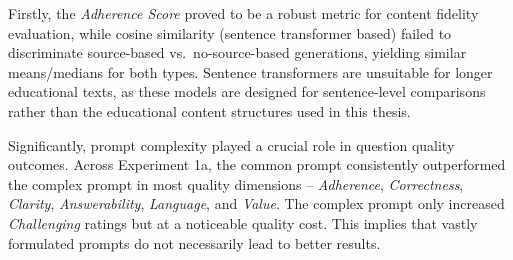 
Firstly, the \textit{Adherence Score} proved to be a robust metric for content fidelity evaluation, while cosine similarity (sentence transformer based) failed to discriminate source-based vs.\ no-source-based generations, yielding similar means/medians for both types. Sentence transformers are unsuitable for longer educational texts, as these models are designed for sentence-level comparisons rather than the educational content structures used in this thesis.

Significantly, prompt complexity played a crucial role in question quality outcomes. Across Experiment 1a, the common prompt consistently outperformed the complex prompt in most quality dimensions -- \textit{Adherence}, \textit{Correctness}, \textit{Clarity}, \textit{Answerability}, \textit{Language}, and \textit{Value}. The complex prompt only increased \textit{Challenging} ratings but at a noticeable quality cost. This implies that vastly formulated prompts do not necessarily lead to better results.

